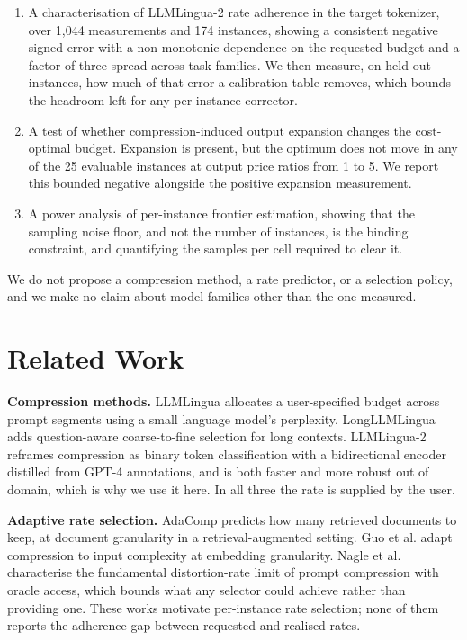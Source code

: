 \documentclass[conference]{IEEEtran}
\begin{document}
\begin{enumerate}
\item A characterisation of LLMLingua-2 rate adherence in the target
tokenizer, over 1{,}044 measurements and 174 instances, showing a consistent
negative signed error with a non-monotonic dependence on the requested budget
and a factor-of-three spread across task families. We then measure, on
held-out instances, how much of that error a calibration table removes, which
bounds the headroom left for any per-instance corrector.
\item A test of whether compression-induced output expansion changes the
cost-optimal budget. Expansion is present, but the optimum does not move in
any of the 25 evaluable instances at output price ratios from 1 to 5. We
report this bounded negative alongside the positive expansion measurement.
\item A power analysis of per-instance frontier estimation, showing that the
sampling noise floor, and not the number of instances, is the binding
constraint, and quantifying the samples per cell required to clear it.
\end{enumerate}

We do not propose a compression method, a rate predictor, or a selection
policy, and we make no claim about model families other than the one measured.

\section{Related Work}

\textbf{Compression methods.} LLMLingua \cite{jiang2023llmlingua} allocates a
user-specified budget across prompt segments using a small language model's
perplexity. LongLLMLingua \cite{jiang2024longllmlingua} adds question-aware
coarse-to-fine selection for long contexts. LLMLingua-2
\cite{pan2024llmlingua2} reframes compression as binary token classification
with a bidirectional encoder distilled from GPT-4 annotations, and is both
faster and more robust out of domain, which is why we use it here. In all
three the rate is supplied by the user.

\textbf{Adaptive rate selection.} AdaComp \cite{zhang2024adacomp} predicts how
many retrieved documents to keep, at document granularity in a
retrieval-augmented setting. Guo et al. \cite{guo2025adaptive} adapt
compression to input complexity at embedding granularity. Nagle et al.
\cite{nagle2024limits} characterise the fundamental distortion-rate limit of
prompt compression with oracle access, which bounds what any selector could
achieve rather than providing one. These works motivate per-instance rate
selection; none of them reports the adherence gap between requested and
realised rates.
\end{document}
